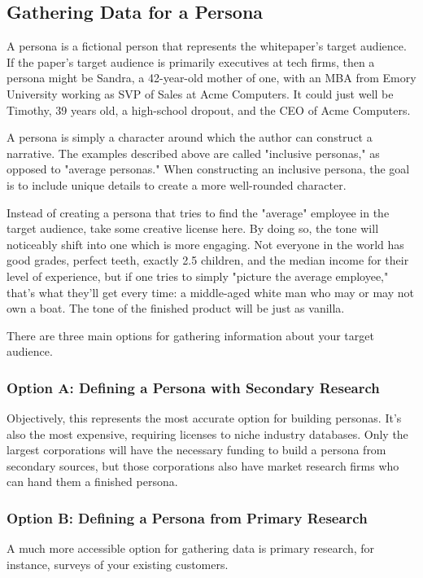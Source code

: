 \documentclass[letterpaper]{article}
\begin{document}
\subsection{Gathering Data for a Persona}
A persona is a fictional person that represents the whitepaper's target audience. If the paper's target audience is primarily executives at tech firms, then a persona might be Sandra, a 42-year-old mother of one, with an MBA from Emory University working as SVP of Sales at Acme Computers. It could just well be Timothy, 39 years old, a high-school dropout, and the CEO of Acme Computers.

A persona is simply a character around which the author can construct a narrative. The examples described above are called "inclusive personas," as opposed to "average personas." When constructing an inclusive persona, the goal is to include unique details to create a more well-rounded character. 

Instead of creating a persona that tries to find the "average" employee in the target audience, take some creative license here. By doing so, the tone will noticeably shift into one which is more engaging. Not everyone in the world has good grades, perfect teeth, exactly 2.5 children, and the median income for their level of experience, but if one tries to simply "picture the average employee," that's what they'll get every time: a middle-aged white man who may or may not own a boat. The tone of the finished product will be just as vanilla.

There are three main options for gathering information about your target audience.

    \subsubsection{Option A: Defining a Persona with Secondary Research}

    Objectively, this represents the most accurate option for building personas. It's also the most expensive, requiring licenses to niche industry databases. Only the largest corporations will have the necessary funding to build a persona from secondary sources, but those corporations also have market research firms who can hand them a finished persona.

    \subsubsection{Option B: Defining a Persona from Primary Research}
    A much more accessible option for gathering data is primary research, for instance, surveys of your existing customers. 
\end{document}
